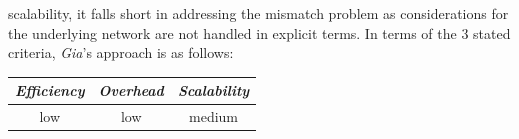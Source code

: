 scalability, it falls short in addressing the mismatch problem
as considerations for the underlying network are not handled in explicit
terms.
%
%
In terms of the $3$ stated criteria, {\sl Gia}'s approach is as follows:
\begin{center}
{\footnotesize
\begin{tabular}{ccc}
\emph{Efficiency} & \emph{Overhead} & \emph{Scalability} \\
\hline
low &
low &
medium
\end{tabular}
}
\end{center}


